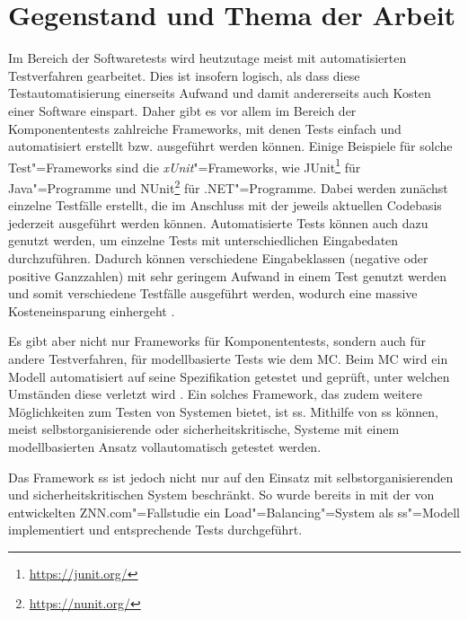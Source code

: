 \chapter{Gegenstand und Thema der Arbeit}
\label{ch:intro}

Im Bereich der Softwaretests wird heutzutage meist mit automatisierten Testverfahren gearbeitet.
Dies ist insofern logisch, als dass diese Testautomatisierung einerseits Aufwand und damit andererseits auch Kosten einer Software einspart.
Daher gibt es vor allem im Bereich der Komponententests zahlreiche Frameworks, mit denen Tests einfach und automatisiert erstellt bzw. ausgeführt werden können.
Einige Beispiele für solche Test"=Frameworks sind die \emph{xUnit}"=Frameworks, wie JUnit\footnote{\url{https://junit.org/}} für Java"=Programme und NUnit\footnote{\url{https://nunit.org/}} für .NET"=Programme.
Dabei werden zunächst einzelne Testfälle erstellt, die im Anschluss mit der jeweils aktuellen Codebasis jederzeit ausgeführt werden können.
Automatisierte Tests können auch dazu genutzt werden, um einzelne Tests mit unterschiedlichen Eingabedaten durchzuführen.
Dadurch können verschiedene Eingabeklassen (\zB negative oder positive Ganzzahlen) mit sehr geringem Aufwand in einem Test genutzt werden und somit verschiedene Testfälle ausgeführt werden, wodurch eine massive Kosteneinsparung einhergeht \cite{Polo2013}.

Es gibt aber nicht nur Frameworks für Komponententests, sondern auch für andere Testverfahren, \zB für modellbasierte Tests wie dem \gls{MC}.
Beim \gls{MC} wird ein Modell automatisiert auf seine Spezifikation getestet und geprüft, unter welchen Umständen diese verletzt wird \cite{Grumberg1999,Habermaier2015}.
Ein solches Framework, das zudem weitere Möglichkeiten zum Testen von Systemen bietet, ist \gls{ss}.
Mithilfe von \gls{ss} können, meist selbstorganisierende oder sicherheitskritische, Systeme mit einem modellbasierten Ansatz vollautomatisch getestet werden.

Das Framework \gls{ss} ist jedoch nicht nur auf den Einsatz mit selbstorganisierenden und sicherheitskritischen System beschränkt.
So wurde bereits in \cite{Eberhardinger2017} mit der von \citeauthor{Cheng2008} entwickelten ZNN.com"=Fallstudie \cite{Cheng2008} ein Load"=Balancing"=System als \gls{ss}"=Modell implementiert und entsprechende Tests durchgeführt.

